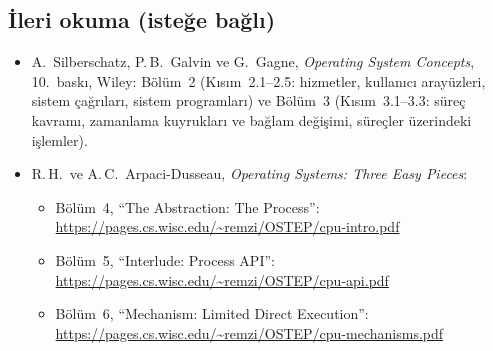 \documentclass[11pt,a4paper]{article}
\begin{document}
\subsection*{İleri okuma (isteğe bağlı)}
\begin{itemize}
  \item A.\ Silberschatz, P.\,B.\ Galvin ve G.\ Gagne, \emph{Operating System Concepts}, 10.\ baskı, Wiley: Bölüm~2 (Kısım~2.1--2.5: hizmetler, kullanıcı arayüzleri, sistem çağrıları, sistem programları) ve Bölüm~3 (Kısım~3.1--3.3: süreç kavramı, zamanlama kuyrukları ve bağlam değişimi, süreçler üzerindeki işlemler).
  \item R.\,H.\ ve A.\,C.\ Arpaci-Dusseau, \emph{Operating Systems: Three Easy Pieces}:
    \begin{itemize}
      \item Bölüm~4, ``The Abstraction: The Process'': \url{https://pages.cs.wisc.edu/~remzi/OSTEP/cpu-intro.pdf}
      \item Bölüm~5, ``Interlude: Process API'': \url{https://pages.cs.wisc.edu/~remzi/OSTEP/cpu-api.pdf}
      \item Bölüm~6, ``Mechanism: Limited Direct Execution'': \url{https://pages.cs.wisc.edu/~remzi/OSTEP/cpu-mechanisms.pdf}
    \end{itemize}
\end{itemize}
\end{document}
